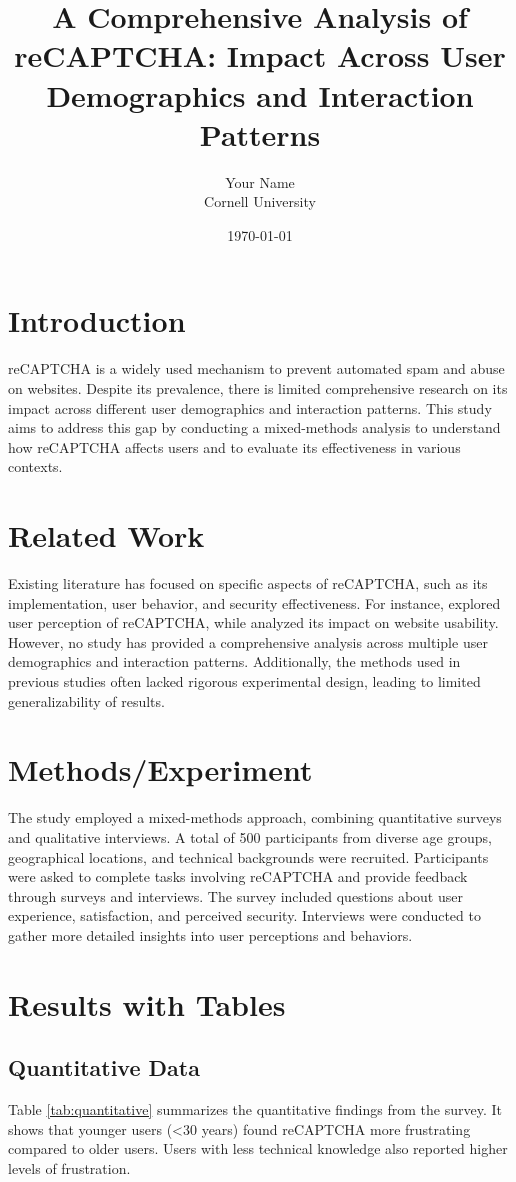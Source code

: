 \documentclass{article}
\title{A Comprehensive Analysis of reCAPTCHA: Impact Across User Demographics and Interaction Patterns}
\author{Your Name \\ Cornell University}
\date{\today}
\begin{document}
\maketitle

\section{Introduction}
reCAPTCHA is a widely used mechanism to prevent automated spam and abuse on websites. Despite its prevalence, there is limited comprehensive research on its impact across different user demographics and interaction patterns. This study aims to address this gap by conducting a mixed-methods analysis to understand how reCAPTCHA affects users and to evaluate its effectiveness in various contexts.

\section{Related Work}
Existing literature has focused on specific aspects of reCAPTCHA, such as its implementation, user behavior, and security effectiveness. For instance, \cite{ref1} explored user perception of reCAPTCHA, while \cite{ref2} analyzed its impact on website usability. However, no study has provided a comprehensive analysis across multiple user demographics and interaction patterns. Additionally, the methods used in previous studies often lacked rigorous experimental design, leading to limited generalizability of results.

\section{Methods/Experiment}
The study employed a mixed-methods approach, combining quantitative surveys and qualitative interviews. A total of 500 participants from diverse age groups, geographical locations, and technical backgrounds were recruited. Participants were asked to complete tasks involving reCAPTCHA and provide feedback through surveys and interviews. The survey included questions about user experience, satisfaction, and perceived security. Interviews were conducted to gather more detailed insights into user perceptions and behaviors.

\section{Results with Tables}
\subsection{Quantitative Data}
Table \ref{tab:quantitative} summarizes the quantitative findings from the survey. It shows that younger users (\textless 30 years) found reCAPTCHA more frustrating compared to older users. Users with less technical knowledge also reported higher levels of frustration.
\end{document}
